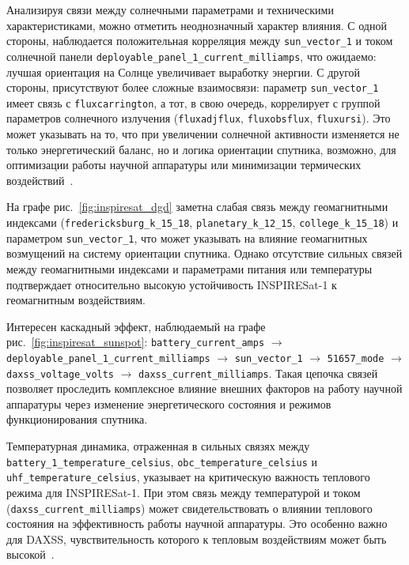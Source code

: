 Анализируя связи между солнечными параметрами и техническими характеристиками,
можно отметить неоднозначный характер влияния. С одной стороны, наблюдается
положительная корреляция между \texttt{sun\_vector\_1} и током солнечной панели
\texttt{deployable\_panel\_1\_current\_milliamps}, что ожидаемо: лучшая
ориентация на Солнце увеличивает выработку энергии. С другой стороны,
присутствуют более сложные взаимосвязи: параметр \texttt{sun\_vector\_1} имеет
связь с \texttt{fluxcarrington}, а тот, в свою очередь, коррелирует с группой
параметров солнечного излучения (\texttt{fluxadjflux}, \texttt{fluxobsflux},
\texttt{fluxursi}). Это может указывать на то, что при увеличении солнечной
активности изменяется не только энергетический баланс, но и логика ориентации
спутника, возможно, для оптимизации работы научной аппаратуры или минимизации
термических воздействий~\cite{nanosats_inspiresat}.

На графе рис.~\ref{fig:inspiresat_dgd}
заметна
слабая связь между геомагнитными индексами (\texttt{fredericksburg\_k\_15\_18},
\texttt{planetary\_k\_12\_15}, \texttt{college\_k\_15\_18}) и параметром
\texttt{sun\_vector\_1}, что может указывать на влияние геомагнитных возмущений
на систему ориентации спутника. Однако отсутствие сильных связей между
геомагнитными индексами и параметрами питания или температуры подтверждает
относительно высокую устойчивость INSPIRESat-1 к геомагнитным воздействиям.

Интересен каскадный эффект, наблюдаемый на графе
рис.~\ref{fig:inspiresat_sunspot}:
\texttt{battery\_current\_amps} $\rightarrow$
\texttt{deployable\_panel\_1\_current\_milliamps} $\rightarrow$
\texttt{sun\_vector\_1} $\rightarrow$ \texttt{51657\_mode} $\rightarrow$
\texttt{daxss\_voltage\_volts} $\rightarrow$ \texttt{daxss\_current\_milliamps}.
Такая цепочка связей позволяет проследить комплексное влияние внешних факторов
на работу научной аппаратуры через изменение энергетического состояния и режимов
функционирования спутника.

Температурная динамика, отраженная в сильных связях между
\texttt{battery\_1\_temperature\_celsius}, \texttt{obc\_temperature\_celsius} и
\texttt{uhf\_temperature\_celsius}, указывает на критическую важность теплового
режима для INSPIRESat-1. При этом связь между температурой и током
(\texttt{daxss\_current\_milliamps}) может свидетельствовать о влиянии теплового
состояния на эффективность работы научной аппаратуры. Это особенно важно для
DAXSS, чувствительность которого к тепловым воздействиям может быть
высокой~\cite{eoportal_inspiresat}.


